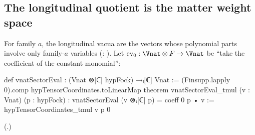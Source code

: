 \subsection{The longitudinal quotient is the matter weight space}

For family $a$, the longitudinal vacua are the vectors whose polynomial parts involve only family-$a$
variables (: ).  Let
$\mathrm{ev}_0:\Vnat\otimes F\to\Vnat$ be ``take the coefficient of the constant monomial'':
\begin{leancode}
def vnatSectorEval : (Vnat ⊗[ℂ] hypFock) →ₗ[ℂ] Vnat :=
  (Finsupp.lapply 0).comp hypTensorCoordinates.toLinearMap
theorem vnatSectorEval_tmul (v : Vnat) (p : hypFock) :
    vnatSectorEval (v ⊗ₜ[ℂ] p) = coeff 0 p • v := hypTensorCoordinates_tmul v p 0
\end{leancode}
(.)

